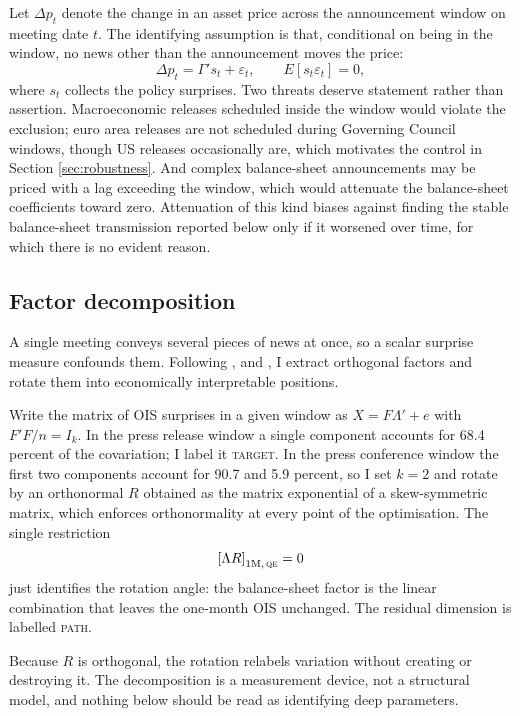 \documentclass[11pt]{article}
\begin{document}
Let $\Delta p_t$ denote the change in an asset price across the announcement
window on meeting date $t$. The identifying assumption is that, conditional on
being in the window, no news other than the announcement moves the price:
\begin{equation}
\Delta p_t = \Gamma' s_t + \varepsilon_t, \qquad E[s_t \varepsilon_t] = 0,
\end{equation}
where $s_t$ collects the policy surprises. Two threats deserve statement rather
than assertion. Macroeconomic releases scheduled inside the window would violate
the exclusion; euro area releases are not scheduled during Governing Council
windows, though US releases occasionally are, which motivates the control in
Section \ref{sec:robustness}. And complex balance-sheet announcements may be
priced with a lag exceeding the window, which would attenuate the balance-sheet
coefficients toward zero. Attenuation of this kind biases against finding the
stable balance-sheet transmission reported below only if it worsened over time,
for which there is no evident reason.

\subsection{Factor decomposition}

A single meeting conveys several pieces of news at once, so a scalar surprise
measure confounds them. Following \citet{gurkaynak2005}, \citet{swanson2021} and
\citet{altavilla2019}, I extract orthogonal factors and rotate them into
economically interpretable positions.

Write the matrix of OIS surprises in a given window as $X = F \Lambda' + e$ with
$F'F/n = I_k$. In the press release window a single component accounts for 68.4
percent of the covariation; I label it \textsc{target}. In the press conference
window the first two components account for 90.7 and 5.9 percent, so I set
$k = 2$ and rotate by an orthonormal $R$ obtained as the matrix exponential of a
skew-symmetric matrix, which enforces orthonormality at every point of the
optimisation. The single restriction
\begin{equation}
\left[\Lambda R\right]_{\text{1M},\,\textsc{qe}} = 0
\end{equation}
just identifies the rotation angle: the balance-sheet factor is the linear
combination that leaves the one-month OIS unchanged. The residual dimension is
labelled \textsc{path}.

Because $R$ is orthogonal, the rotation relabels variation without creating or
destroying it. The decomposition is a measurement device, not a structural
model, and nothing below should be read as identifying deep parameters.
\end{document}
